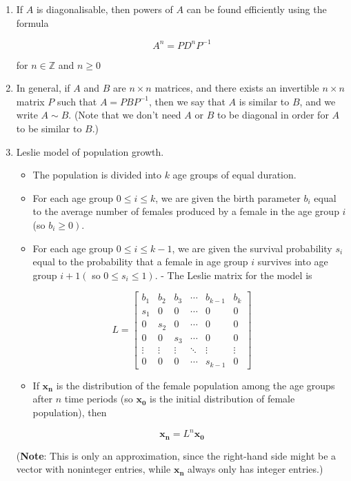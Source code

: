 \documentclass[10pt]{article}
\begin{document}
\begin{enumerate}
\item If $A$ is diagonalisable, then powers of $A$ can be found efficiently using the formula

$$
A^{n}=P D^{n} P^{-1}
$$

for $n \in \mathbb{Z}$ and $n \geq 0$

\item In general, if $A$ and $B$ are $n \times n$ matrices, and there exists an invertible $n \times n$ matrix $P$ such that $A=P B P^{-1}$, then we say that $A$ is similar to $B$, and we write $A \sim B$. (Note that we don't need $A$ or $B$ to be diagonal in order for $A$ to be similar to $B$.)

\item Leslie model of population growth.

\begin{itemize}
  \item The population is divided into $k$ age groups of equal duration.

  \item For each age group $0 \leq i \leq k$, we are given the birth parameter $b_{i}$ equal to the average number of females produced by a female in the age group $i$ (so $\left.b_{i} \geq 0\right)$.

  \item For each age group $0 \leq i \leq k-1$, we are given the survival probability $s_{i}$ equal to the probability that a female in age group $i$ survives into age group $i+1\left(\right.$ so $\left.0 \leq s_{i} \leq 1\right)$. - The Leslie matrix for the model is

\end{itemize}

$$
L=\left[\begin{array}{cccccc}
b_{1} & b_{2} & b_{3} & \cdots & b_{k-1} & b_{k} \\
s_{1} & 0 & 0 & \cdots & 0 & 0 \\
0 & s_{2} & 0 & \cdots & 0 & 0 \\
0 & 0 & s_{3} & \cdots & 0 & 0 \\
\vdots & \vdots & \vdots & \ddots & \vdots & \vdots \\
0 & 0 & 0 & \cdots & s_{k-1} & 0
\end{array}\right]
$$

\begin{itemize}
  \item If $\mathbf{x}_{\mathbf{n}}$ is the distribution of the female population among the age groups after $n$ time periods (so $\mathbf{x}_{\mathbf{0}}$ is the initial distribution of female population), then
\end{itemize}

$$
\mathbf{x}_{\mathbf{n}}=L^{n} \mathbf{x}_{\mathbf{0}}
$$

(\textbf{Note}: This is only an approximation, since the right-hand side might be a vector with noninteger entries, while $\mathbf{x}_{\mathbf{n}}$ always only has integer entries.)
\end{enumerate}
\end{document}

